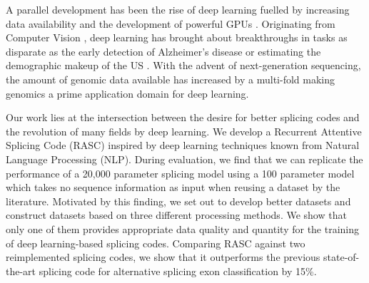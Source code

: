 A parallel development has been the rise of deep learning fuelled by increasing data availability and the development of powerful GPUs \cite{deeplearning}. 
Originating from Computer Vision \cite{alexnet}, deep learning has brought about breakthroughs in tasks as disparate as the early detection of Alzheimer's disease \cite{alzheimerdeeplearning} or estimating the demographic makeup of the US \cite{demographic}. 
With the advent of next-generation sequencing, the amount of genomic data available has increased by a multi-fold making genomics a prime application domain for deep learning. 



Our work lies at the intersection between the desire for better splicing codes and the revolution of many fields by deep learning. We develop a Recurrent Attentive Splicing Code (RASC) inspired by deep learning techniques known from Natural Language Processing (NLP). During evaluation, we find that we can replicate the performance of a 20,000 parameter splicing model using a 100 parameter model which takes no sequence information as input when reusing a dataset by the literature. Motivated by this finding, we set out to develop better datasets and construct datasets based on three different processing methods. We show that only one of them provides appropriate data quality and quantity for the training of deep learning-based splicing codes. Comparing RASC against two reimplemented splicing codes, we show that it outperforms the previous state-of-the-art splicing code for alternative splicing exon classification by 15\%. 





